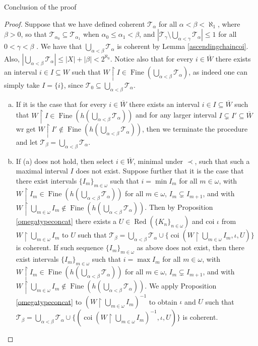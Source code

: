 \documentclass{amsart}
\theoremstyle{definition}\newtheorem{theorem}{Theorem}
\theoremstyle{definition}\newtheorem*{A}{Main Theorem}
\theoremstyle{definition}\newtheorem*{B}{Theorem \ref{elementaryequiv}}
\theoremstyle{definition}\newtheorem*{C}{Theorem \ref{continuous}}
\theoremstyle{definition}\newtheorem*{D}{Theorem \ref{bigisomorphism2}}
\theoremstyle{definition}\newtheorem{bigtheorem}{Main Theorem}
\numberwithin{theorem}{section}
\theoremstyle{definition}\newtheorem{corollary}[theorem]{Corollary}
\theoremstyle{definition}\newtheorem{proposition}[theorem]{Proposition}
\theoremstyle{definition}\newtheorem{definition}[theorem]{Definition}
\theoremstyle{definition}\newtheorem{question}[theorem]{Question}
\theoremstyle{definition}\newtheorem{example}[theorem]{Example}
\theoremstyle{definition}\newtheorem{remark}[theorem]{Remark}
\theoremstyle{definition}\newtheorem{note}[theorem]{Note}
\theoremstyle{definition}\newtheorem{lemma}[theorem]{Lemma}
\theoremstyle{definition}\newtheorem{fact}[theorem]{Fact}
\theoremstyle{definition}\newtheorem{define}[theorem]{Definition}
\theoremstyle{definition}\newtheorem{claim}[theorem]{Claim}
\theoremstyle{definition}\newtheorem{obs}[theorem]{Observation}
\theoremstyle{definition}\newtheorem{definitions}[theorem]{Definitions}
\newcommand{\Red}{\operatorname{Red}}
\newcommand{\Fine}{\operatorname{Fine}}
\newcommand{\coi}{\operatorname{coi}}
\begin{document}
\begin{section}{Conclusion of the proof}
\begin{proof}
Suppose that we have defined coherent $\mathcal{T}_{\alpha}$ for all $\alpha < \beta < \aleph_1$, where $\beta > 0$, so that $\mathcal{T}_{\alpha_0} \subseteq \mathcal{T}_{\alpha_1}$ when $\alpha_0 \leq \alpha_1 < \beta$, and $|\mathcal{T}_{\gamma} \setminus \bigcup_{\alpha < \gamma}\mathcal{T}_{\alpha}| \leq 1$ for all $0 < \gamma < \beta$ .  We have that $\bigcup_{\alpha < \beta} \mathcal{T}_{\alpha}$ is coherent by Lemma \ref{ascendingchaincoi}.  Also, $|\bigcup_{\alpha < \beta} \mathcal{T}_{\alpha}| \leq |X| + |\beta| < 2^{\aleph_0}$.  Notice also that for every $i \in \overline{W}$ there exists an interval $i \in I \subseteq W$ such that $W \upharpoonright I \in \Fine(\bigcup_{\alpha < \beta} \mathcal{T}_{\alpha})$, as indeed one can simply take $I = \{i\}$, since $\mathcal{T}_0 \subseteq \bigcup_{\alpha < \beta} \mathcal{T}_{\alpha}$.

\begin{enumerate}[(a)]

\item If it is the case that for every $i \in \overline{W}$ there exists an interval $i \in I \subseteq \overline{W}$ such that $W \upharpoonright I \in \Fine(h(\bigcup_{\alpha < \beta} \mathcal{T}_{\alpha}))$ and for any larger interval $I \subsetneq I' \subseteq \overline{W}$ wr get $W \upharpoonright I' \notin \Fine(h(\bigcup_{\alpha < \beta} \mathcal{T}_{\alpha}))$, then we terminate the procedure and let $\mathcal{T}_{\beta} = \bigcup_{\alpha < \beta} \mathcal{T}_{\alpha}$.

\item If (a) does not hold, then select $i \in \overline{W}$, minimal under $\prec$, such that such a maximal interval $I$ does not exist.  Suppose further that it is the case that there exist intervals $\{I_m\}_{m \in \omega}$ such that $i = \min I_m$ for all $m \in \omega$, with $W \upharpoonright I_m \in \Fine(h(\bigcup_{\alpha < \beta} \mathcal{T}_{\alpha}))$ for all $m \in \omega$, $I_m \subsetneq I_{m+1}$, and with $W \upharpoonright \bigcup_{m \in \omega} I_m \notin \Fine(h(\bigcup_{\alpha < \beta} \mathcal{T}_{\alpha}))$.  Then by Proposition \ref{omegatypeconcat} there exists a $U \in \Red(\{K_n\}_{n \in \omega})$ and coi $\iota$ from $W\upharpoonright \bigcup_{m \in \omega} I_m$ to $U$ such that $\mathcal{T}_{\beta} = \bigcup_{\alpha < \beta} \mathcal{T}_{\alpha} \cup \{\coi(W \upharpoonright \bigcup_{m \in \omega} I_m, \iota, U)\}$ is coherent.  If such sequence $\{I_m\}_{m \in \omega}$ as above does not exist, then there exist intervals $\{I_m\}_{m \in \omega}$ such that $i = \max I_m$ for all $m \in \omega$, with $W \upharpoonright I_m \in \Fine(h(\bigcup_{\alpha < \beta} \mathcal{T}_{\alpha}))$ for all $m \in \omega$, $I_m \subsetneq I_{m+1}$, and with $W \upharpoonright \bigcup_{m \in \omega} I_m \notin \Fine(h(\bigcup_{\alpha < \beta} \mathcal{T}_{\alpha}))$.  We apply Proposition \ref{omegatypeconcat} to $(W \upharpoonright \bigcup_{m \in \omega} I_m)^{-1}$ to obtain $\iota$ and $U$ such that $\mathcal{T}_{\beta} = \bigcup_{\alpha < \beta} \mathcal{T}_{\alpha} \cup \{(\coi(W \upharpoonright \bigcup_{m \in \omega} I_m)^{-1}, \iota, U)\}$ is coherent.
\end{enumerate}


\end{proof}
\end{section}
\end{document}
